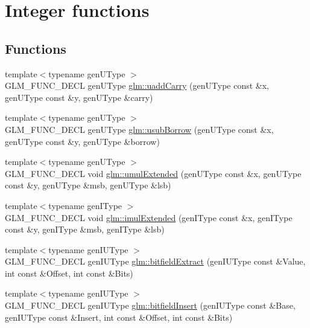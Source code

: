 \hypertarget{group__core__func__integer}{\section{Integer functions}
\label{group__core__func__integer}
}
\subsection*{Functions}
\begin{DoxyCompactItemize}
\item 
{\footnotesize template$<$typename gen\-U\-Type $>$ }\\G\-L\-M\-\_\-\-F\-U\-N\-C\-\_\-\-D\-E\-C\-L gen\-U\-Type \hyperlink{group__core__func__integer_ga19276bb7adbe9f0d74515ae49e40b481}{glm\-::uadd\-Carry} (gen\-U\-Type const \&x, gen\-U\-Type const \&y, gen\-U\-Type \&carry)
\item 
{\footnotesize template$<$typename gen\-U\-Type $>$ }\\G\-L\-M\-\_\-\-F\-U\-N\-C\-\_\-\-D\-E\-C\-L gen\-U\-Type \hyperlink{group__core__func__integer_gae5b4a6cefd1e21fd2e1b8526b4c964a7}{glm\-::usub\-Borrow} (gen\-U\-Type const \&x, gen\-U\-Type const \&y, gen\-U\-Type \&borrow)
\item 
{\footnotesize template$<$typename gen\-U\-Type $>$ }\\G\-L\-M\-\_\-\-F\-U\-N\-C\-\_\-\-D\-E\-C\-L void \hyperlink{group__core__func__integer_gad991bf53779a4309a920bb7bfcf2639c}{glm\-::umul\-Extended} (gen\-U\-Type const \&x, gen\-U\-Type const \&y, gen\-U\-Type \&msb, gen\-U\-Type \&lsb)
\item 
{\footnotesize template$<$typename gen\-I\-Type $>$ }\\G\-L\-M\-\_\-\-F\-U\-N\-C\-\_\-\-D\-E\-C\-L void \hyperlink{group__core__func__integer_ga7d284e3ea5059cae9fe8f0fe1a76dd02}{glm\-::imul\-Extended} (gen\-I\-Type const \&x, gen\-I\-Type const \&y, gen\-I\-Type \&msb, gen\-I\-Type \&lsb)
\item 
{\footnotesize template$<$typename gen\-I\-U\-Type $>$ }\\G\-L\-M\-\_\-\-F\-U\-N\-C\-\_\-\-D\-E\-C\-L gen\-I\-U\-Type \hyperlink{group__core__func__integer_ga251d309beb171bf95117d2c301b2ad8b}{glm\-::bitfield\-Extract} (gen\-I\-U\-Type const \&Value, int const \&Offset, int const \&Bits)
\item 
{\footnotesize template$<$typename gen\-I\-U\-Type $>$ }\\G\-L\-M\-\_\-\-F\-U\-N\-C\-\_\-\-D\-E\-C\-L gen\-I\-U\-Type \hyperlink{group__core__func__integer_ga7ab09972d52094d97d2480982e657dd0}{glm\-::bitfield\-Insert} (gen\-I\-U\-Type const \&Base, gen\-I\-U\-Type const \&Insert, int const \&Offset, int const \&Bits)

\end{DoxyCompactItemize}
